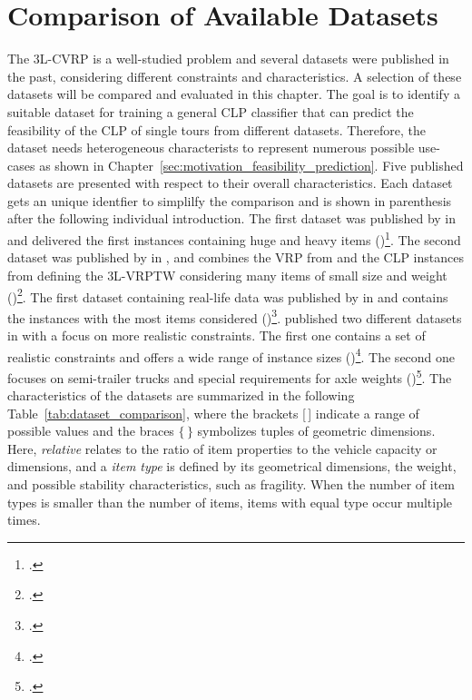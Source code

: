 \chapter{Comparison of Available Datasets}
\label{sec:dataset_selection}

The \gls{3L-CVRP} is a well-studied problem and several datasets were published in the past, considering
different constraints and characteristics. A selection of these datasets will be compared and evaluated
in this chapter. The goal is to identify a suitable dataset for training a general \gls{CLP} classifier that can predict
the feasibility of the \gls{CLP} of single tours from different datasets. Therefore, the dataset needs
heterogeneous characterists to represent numerous possible use-cases
as shown in Chapter~\ref{sec:motivation_feasibility_prediction}. Five published  datasets are presented with respect to their overall characteristics.
Each dataset gets an unique identfier to simplilfy the comparison and is shown in parenthesis
after the following individual introduction. The first  dataset was published by \citeauthor*{gendreau_tabu_2006} in
\citeyear{gendreau_tabu_2006} and delivered the first  instances containing huge and heavy items (\gendreauDataSet)\footcite[cf.][]{gendreau_tabu_2006}.
The second dataset was published by \citeauthor*{moura_integrated_2009} in \citeyear{moura_integrated_2009},
and combines the \gls{VRP} from \citeauthor*{solomon_algorithms_1987} and the \gls{CLP} instances from
\citeauthor*{bischoff_issues_1995} defining the \gls{3L-VRPTW} considering
many items of small size and weight (\mouraDataSet)\footcites[cf.][]{solomon_algorithms_1987,bischoff_issues_1995}[][]{moura_integrated_2009}.
The first dataset containing real-life data was published by \citeauthor*{ceschia_local_2013} in \citeyear{ceschia_local_2013}
and contains the instances with the most items considered (\ceschiaDataSet)\footcite[cf.][]{ceschia_local_2013}.
\citeauthor*{krebs_advanced_2021} published two different datasets in
\citeyear{krebs_advanced_2021} with a focus on more realistic constraints. The first one contains a set
of realistic constraints and offers a wide range of instance sizes (\krebsADataSet)\footcite[cf.][]{krebs_advanced_2021}.
The second one focuses on semi-trailer trucks and special requirements for axle weights (\krebsBDataSet)\footcite[cf.][]{krebs_axle_2021}.
The characteristics of the datasets are summarized in the following Table~\ref{tab:dataset_comparison},
where the brackets [\,] indicate a range of possible values and the braces $\{\,\}$ symbolizes tuples of geometric dimensions.
Here, \textit{relative} relates to the ratio of item properties to the vehicle capacity or dimensions,
and a \textit{item type} is defined by its geometrical dimensions, the weight, and possible stability characteristics, such as fragility.
When the number of item types is smaller than the number of items, items with equal type occur multiple times.

